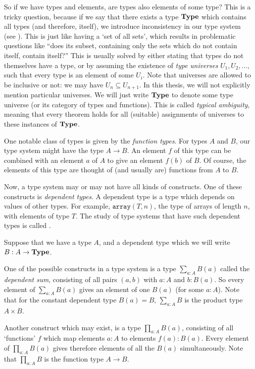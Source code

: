 So if we have types and elements, are types also elements of some type? This is a tricky question, because if we say that there exists a type $ \mathbf{Type} $ which contains all types (and therefore, itself), we introduce inconsistency in our type system (see \autocite{girard}). This is just like having a `set of all sets', which results in problematic questions like ``does its subset, containing only the sets which do not contain itself, contain itself?'' This is usually solved by either stating that types do not themselves have a type, or by assuming the existence of \textit{type universes} $ U_1, U_2, \dots $, such that every type is an element of some $ U_i $. Note that universes are allowed to be inclusive or not: we may have $ U_n \subseteq U_{n + 1} $. In this thesis, we will not explicitly mention particular universes. We will just write $ \mathbf{Type} $ to denote some type universe (or its category of types and functions). This is called \textit{typical ambiguity}, meaning that every theorem holds for all (suitable) assignments of universes to these instances of $ \mathbf{Type} $.

One notable class of types is given by the \textit{function types}. For types $ A $ and $ B $, our type system might have the type $ A \to B $. An element $ f $ of this type can be combined with an element $ a $ of $ A $ to give an element $ f(b) $ of $ B $. Of course, the elements of this type are thought of (and usually are) functions from $ A $ to $ B $.

Now, a type system may or may not have all kinds of constructs. One of these constructs is \textit{dependent types}. A dependent type is a type which depends on values of other types. For example, $ \mathtt{array}(T, n) $, the type of arrays of length $ n $, with elements of type $ T $. The study of type systems that have such dependent types is called .

Suppose that we have a type $ A $, and a dependent type which we will write $ B: A \to \mathbf{Type} $.

One of the possible constructs in a type system is a type $ \sum_{a: A} B(a) $ called the \textit{dependent sum}, consisting of all pairs $ (a, b) $ with $ a : A $ and $ b: B(a) $. So every element of $ \sum_{a: A} B(a) $ gives an element of one $ B(a) $ (for some $ a : A $). Note that for the constant dependent type $ B(a) = B $, $ \sum_{a: A} B $ is the product type $ A \times B $.

Another construct which may exist, is a type $ \prod_{a: A} B(a) $, consisting of all `functions' $ f $ which map elements $ a: A $ to elements $ f(a): B(a) $. Every element of $ \prod_{a: A} B(a) $ gives therefore elements of all the $ B(a) $ simultaneously. Note that $ \prod_{a: A} B $ is the function type $ A \to B $.

